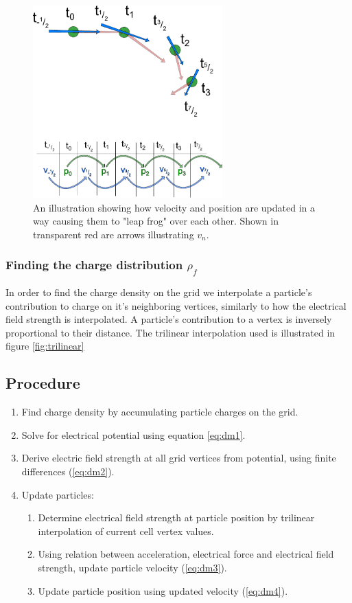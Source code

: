 \begin{figure}[!htbp]
	\centering
	\includegraphics[width=0.65\textwidth]{figure/leapfrog}
	\caption[Leap frog illustration]{An illustration showing how velocity and position are updated in a way causing them to "leap frog" over each
	other. Shown in transparent red are arrows illustrating $v_n$.}
	\label{fig:leapfrog}
\end{figure}

\subsubsection{Finding the charge distribution $\rho_f$}
In order to find the charge density on the grid we interpolate a particle's contribution to charge on it's neighboring
vertices, similarly to how the electrical field strength is interpolated. A particle's contribution to a vertex is
inversely proportional to their distance. The trilinear interpolation used is illustrated in figure \ref{fig:trilinear}

\subsection{Procedure}
\begin{enumerate}
	\item Find charge density by accumulating particle charges on the grid.
	\item Solve for electrical potential using equation \ref{eq:dm1}.
	\item Derive electric field strength at all grid vertices from potential, using finite differences (\ref{eq:dm2}).
	\item Update particles:
	\begin{enumerate}
		\item Determine electrical field strength at particle position by trilinear interpolation of current cell vertex values.
		\item Using relation between acceleration, electrical force and electrical field strength, update particle velocity (\ref{eq:dm3}).
		\item Update particle position using updated velocity (\ref{eq:dm4}).
	\end{enumerate}
\end{enumerate}

